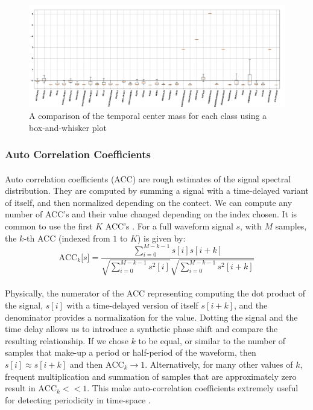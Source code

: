 \documentclass[12pt,letterpaper]{article}
\begin{document}
\begin{figure}[H]
\begin{center}
\includegraphics[scale=0.3]{../FiguresFeatures/TCM}
\end{center}
\caption{A comparison of the temporal center mass for each class using a box-and-whisker plot}
\label{fig-FeatureTCM}
\end{figure}


\subsubsection{Auto Correlation Coefficients}

\paragraph*{}Auto correlation coefficients (ACC) are rough estimates of the signal spectral distribution. They are computed by summing a signal with a time-delayed variant of itself, and then normalized depending on the contect. We can compute any number of ACC's and their value changed depending on the index chosen. It is common to use the first $K$ ACC's \cite{Serizel}. For a full waveform signal $s$, with $M$ samples, the $k$-th ACC (indexed from $1$ to $K$) is given by:
\begin{equation}
\label{eqn-FeatureACC}
\text{ACC}_k\big[ s \big] = 
\frac{\sum_{i=0}^{M-k-1}s[i]s[i+k]} {\sqrt{\sum_{i=0}^{M-k-1}s^2[i]} 
\sqrt{\sum_{i=0}^{M-k-1}s^2[i+k]}}
\end{equation}

\paragraph*{}Physically, the numerator of the ACC representing computing the dot product of the signal, $s[i]$ with a time-delayed version of itself $s[i+k]$, and  the denominator provides a normalization for the value. Dotting the signal and the time delay allows us to introduce a synthetic phase shift and compare the resulting relationship. If we chose $k$ to be equal, or similar to the number of samples that make-up a period or half-period of the waveform, then $s[i] \approx s[i+k]$ and then $\text{ACC}_k \rightarrow 1$. Alternatively, for many other values of $k$, frequent multiplication and summation of samples that are approximately zero result in $\text{ACC}_k << 1$. This make auto-correlation coefficients extremely useful for detecting periodicity in time-space \cite{Serizel}.
\end{document}
